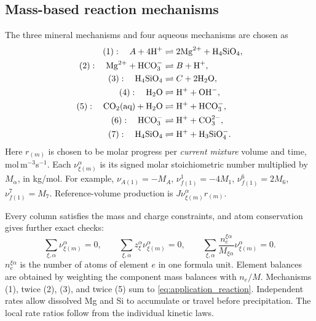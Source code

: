 \documentclass[11pt]{article}
\begin{document}
\subsection{Mass-based reaction mechanisms}
The three mineral mechanisms and four aqueous mechanisms are chosen as
\begin{align}
 (1):\quad A+4\mathrm H^+&\rightleftharpoons2\mathrm{Mg}^{2+}+\mathrm{H_4SiO_4},\notag\\
 (2):\quad\mathrm{Mg}^{2+}+\mathrm{HCO_3^-}&\rightleftharpoons B+\mathrm H^+,\notag\\
 (3):\quad\mathrm{H_4SiO_4}&\rightleftharpoons C+2\mathrm{H_2O},\notag\\
 (4):\quad\mathrm{H_2O}&\rightleftharpoons\mathrm H^++\mathrm{OH^-},\notag\\
 (5):\quad\mathrm{CO_2(aq)}+\mathrm{H_2O}&\rightleftharpoons\mathrm H^++\mathrm{HCO_3^-},\notag\\
 (6):\quad\mathrm{HCO_3^-}&\rightleftharpoons\mathrm H^++\mathrm{CO_3^{2-}},\notag\\
 (7):\quad\mathrm{H_4SiO_4}&\rightleftharpoons\mathrm H^++\mathrm{H_3SiO_4^-}.
 \label{eq:mechanisms}
\end{align}
Here \(r_{(m)}\) is chosen to be molar progress per \emph{current mixture} volume and time, mol\,m\(^{-3}\)s\(^{-1}\). Each \(\nu_{\xi(m)}^\alpha\) is its signed molar stoichiometric number multiplied by \(M_\alpha\), in kg/mol. For example,
\(\nu_{A(1)}=-M_A\), \(\nu_{f(1)}^{1}=-4M_1\),
\(\nu_{f(1)}^{6}=2M_6\), \(\nu_{f(1)}^{7}=M_7\).
Reference-volume production is \(J\nu_{\xi(m)}^\alpha r_{(m)}\).

Every column satisfies the mass and charge constraints, and atom conservation gives further exact checks:
\begin{equation}
 \sum_{\xi,\alpha}\nu_{\xi(m)}^\alpha=0,
 \qquad \sum_{\xi,\alpha}z_\xi^\alpha\nu_{\xi(m)}^\alpha=0,
 \qquad \sum_{\xi,\alpha}\frac{n_e^{\xi\alpha}}{M_{\xi\alpha}}\nu_{\xi(m)}^\alpha=0.
 \label{eq:mechanism_conservation}
\end{equation}
\(n_e^{\xi\alpha}\) is the number of atoms of element \(e\) in one formula unit. Element balances are obtained by weighting the component mass balances with \(n_e/M\). Mechanisms (1), twice (2), (3), and twice (5) sum to \eqref{eq:application_reaction}. Independent rates allow dissolved Mg and Si to accumulate or travel before precipitation. The local rate ratios follow from the individual kinetic laws.
\end{document}
